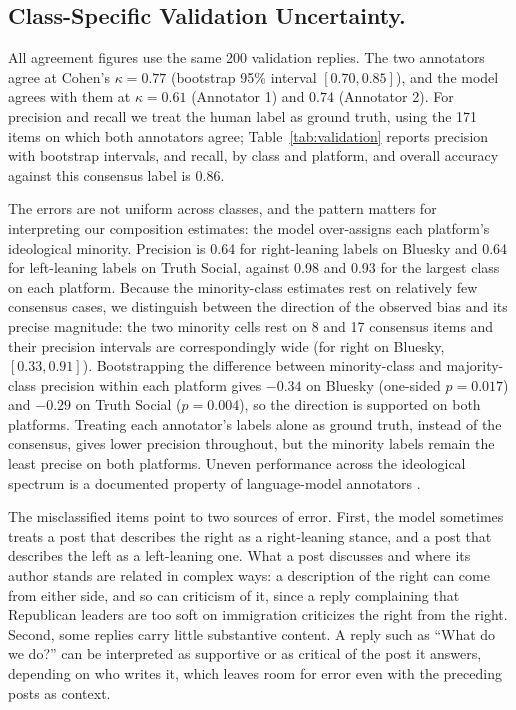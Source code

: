 \documentclass[letterpaper]{article} %
\newcommand{\rev}[1]{{\color{blue}#1}}
\begin{document}
\subsection*{\rev{Class-Specific Validation Uncertainty.}}

\rev{All agreement figures use the same 200 validation replies. The two annotators agree at Cohen's $\kappa = 0.77$ (bootstrap 95\% interval $[0.70, 0.85]$), and the model agrees with them at $\kappa = 0.61$ (Annotator 1) and $0.74$ (Annotator 2). For precision and recall we treat the human label as ground truth, using the 171 items on which both annotators agree; Table~\ref{tab:validation} reports precision with bootstrap intervals, and recall, by class and platform, and overall accuracy against this consensus label is 0.86.}

\rev{The errors are not uniform across classes, and the pattern matters for interpreting our composition estimates: the model over-assigns each platform's ideological minority. Precision is 0.64 for right-leaning labels on Bluesky and 0.64 for left-leaning labels on Truth Social, against 0.98 and 0.93 for the largest class on each platform. Because the minority-class estimates rest on relatively few consensus cases, we distinguish between the direction of the observed bias and its precise magnitude: the two minority cells rest on 8 and 17 consensus items and their precision intervals are correspondingly wide (for right on Bluesky, $[0.33, 0.91]$). Bootstrapping the difference between minority-class and majority-class precision within each platform gives $-0.34$ on Bluesky (one-sided $p = 0.017$) and $-0.29$ on Truth Social ($p = 0.004$), so the direction is supported on both platforms. Treating each annotator's labels alone as ground truth, instead of the consensus, gives lower precision throughout, but the minority labels remain the least precise on both platforms. Uneven performance across the ideological spectrum is a documented property of language-model annotators \citep{vallejovera_llms_2025}.}

\rev{The misclassified items point to two sources of error. First, the model sometimes treats a post that describes the right as a right-leaning stance, and a post that describes the left as a left-leaning one. What a post discusses and where its author stands are related in complex ways: a description of the right can come from either side, and so can criticism of it, since a reply complaining that Republican leaders are too soft on immigration criticizes the right from the right. Second, some replies carry little substantive content. A reply such as ``What do we do?'' can be interpreted as supportive or as critical of the post it answers, depending on who writes it, which leaves room for error even with the preceding posts as context.}
\end{document}
